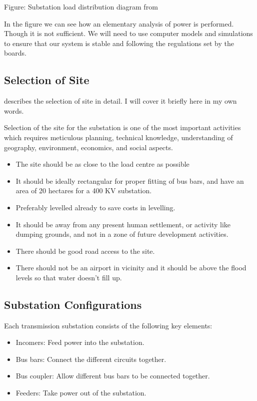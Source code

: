 \documentclass[11pt, a4paper]{article} %
\begin{document}
Figure: Substation load distribution diagram from \citet{400kVSubstationDesign}

In the figure we can see how an elementary analysis of power is performed. Though it is not sufficient. We will need to use computer models and simulations to ensure that our system is stable and following the regulations set by the boards.

\subsection{Selection of Site}
\citet{400kVSubstationDesign} describes the selection of site in detail. I will cover it briefly here in my own words.

Selection of the site for the substation is one of the most important activities which requires meticulous planning, technical knowledge, understanding of geography, environment, economics, and social aspects.

\begin{itemize}
  \item The site should be as close to the load centre as possible
  \item It should be ideally rectangular for proper fitting of bus bars, and have an area of 20 hectares for a 400 KV substation.
  \item Preferably levelled already to save costs in levelling.
  \item It should be away from any present human settlement, or activity like dumping grounds, and not in a zone of future development activities.
  \item There should be good road access to the site.
  \item There should not be an airport in vicinity and  it should be above the flood levels so that water doesn't fill up.
\end{itemize}

\subsection{Substation Configurations}

Each transmission substation consists of the following key elements:

\begin{itemize}
    \item Incomers: Feed power into the substation.
    \item Bus bars: Connect the different circuits together.
    \item Bus coupler: Allow different bus bars to be connected together.
    \item Feeders: Take power out of the substation.
\end{itemize}
\end{document}

